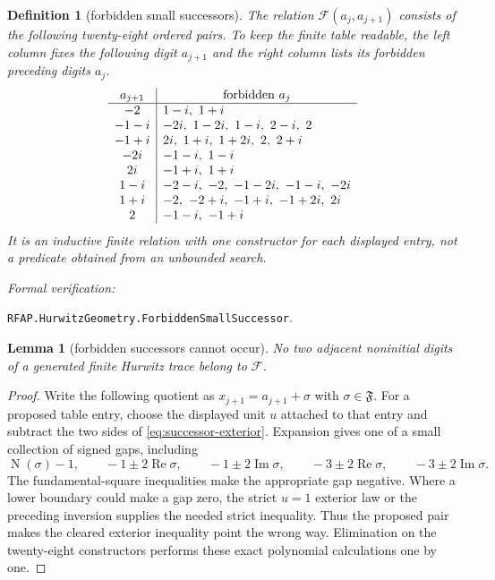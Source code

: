 \documentclass[11pt]{article}
\newtheorem{lemma}[lemma]{Lemma}
\newtheorem{definition}[definition]{Definition}
\newcommand{\Norm}[1]{\operatorname{N}\!\left(#1\right)}
\newcommand{\leanref}[1]{\par\smallskip\noindent
  \emph{Formal verification:}\par\nobreak
  {\raggedright\nolinkurl{#1}.\par}}
\begin{document}
\begin{definition}[forbidden small successors]
\label{def:forbidden-successors}
The relation $\mathcal F(a_j,a_{j+1})$ consists of the following twenty-eight
ordered pairs.  To keep the finite table readable, the left column fixes the
following digit $a_{j+1}$ and the right column lists its forbidden preceding
digits $a_j$.
\[
\begin{array}{c|l}
a_{j+1} & \multicolumn{1}{c}{\text{forbidden }a_j}\\ \hline
-2      & 1-i,\ 1+i\\
-1-i    & -2i,\ 1-2i,\ 1-i,\ 2-i,\ 2\\
-1+i    & 2i,\ 1+i,\ 1+2i,\ 2,\ 2+i\\
-2i     & -1-i,\ 1-i\\
 2i     & -1+i,\ 1+i\\
 1-i    & -2-i,\ -2,\ -1-2i,\ -1-i,\ -2i\\
 1+i    & -2,\ -2+i,\ -1+i,\ -1+2i,\ 2i\\
 2      & -1-i,\ -1+i
\end{array}
\]
It is an inductive finite relation with one constructor for each displayed
entry, not a predicate obtained from an unbounded search.
\end{definition}

\leanref{RFAP.HurwitzGeometry.ForbiddenSmallSuccessor}

\begin{lemma}[forbidden successors cannot occur]
\label{lem:no-forbidden-successor}
No two adjacent noninitial digits of a generated finite Hurwitz trace belong
to $\mathcal F$.
\end{lemma}

\begin{proof}
Write the following quotient as $x_{j+1}=a_{j+1}+\sigma$ with
$\sigma\in\mathfrak F$.  For a proposed table entry, choose the displayed
unit $u$ attached to that entry and subtract the two sides of
\eqref{eq:successor-exterior}.  Expansion gives one of a small collection of
signed gaps, including
\[
 \Norm\sigma-1,\qquad -1\pm2\operatorname{Re}\sigma,
 \qquad -1\pm2\operatorname{Im}\sigma,
 \qquad -3\pm2\operatorname{Re}\sigma,
 \qquad -3\pm2\operatorname{Im}\sigma.
\]
The fundamental-square inequalities make the appropriate gap negative.
Where a lower boundary could make a gap zero, the strict $u=1$ exterior law
or the preceding inversion supplies the needed strict inequality.  Thus the
proposed pair makes the cleared exterior inequality point the wrong way.
Elimination on the twenty-eight constructors performs these exact polynomial
calculations one by one.
\end{proof}
\end{document}

